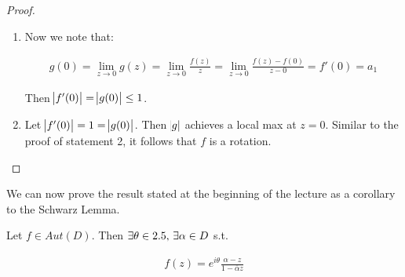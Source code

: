\begin{proof}
\begin{enumerate}
\item Now we note that:

\begin{align*}
    g(0) = \lim_{z \to 0} g(z) = \lim_{z \to 0} \frac{f(z)}{z} = \lim_{z \to 0} \frac{f(z) - f(0)}{z - 0} = f'(0) = a_1
\end{align*}

Then $\abs{f'(0)} = \abs{g(0) } \leq 1$.


\item Let $\abs{f'(0) } = 1 = \abs{g(0)}$. Then $\abs{g}$ achieves a local max at $z = 0$. Similar to the proof of statement 2, it follows that $f$ is a rotation.
\end{enumerate}
\end{proof}


We can now prove the result stated at the beginning of the lecture as a corollary to the Schwarz Lemma.


\begin{corollary}

Let $f \in Aut(D)$. Then $\exists \theta \in 2.5, \, \exists \alpha \in D$ s.t.

\begin{align*}
    f(z) = e^{i \theta} \frac{\alpha - z}{1 - \overline{\alpha } z}
\end{align*}
\end{corollary}

